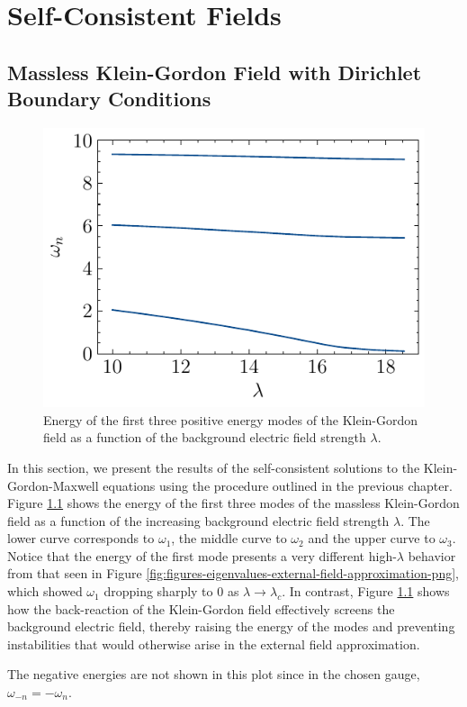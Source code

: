 \chapter{Self-Consistent Fields}
\section{Massless Klein-Gordon Field with Dirichlet Boundary Conditions}

\begin{figure} \centering \includegraphics[width=0.5\linewidth]{figures/dirichlet/eigenvaluesHadamardDirichlet.pdf} \caption{Energy of the first three positive energy modes of the Klein-Gordon field as a function of the background electric field strength $\lambda$.} \label{fig:eigenvaluesHadamardDirichlet} \end{figure}

In this section, we present the results of the self-consistent solutions to the Klein-Gordon-Maxwell equations using the procedure outlined in the previous chapter. Figure \ref{fig:eigenvaluesHadamardDirichlet} shows the energy of the first three modes of the massless Klein-Gordon field as a function of the increasing background electric field strength $\lambda$. The lower curve corresponds to $\omega_1$, the middle curve to $\omega_2$ and the upper curve to $\omega_3$.
Notice that the energy of the first mode presents a very different high-$\lambda$ behavior from that seen in Figure \ref{fig:figures-eigenvalues-external-field-approximation-png}, which showed $\omega_1$ dropping sharply to 0 as $\lambda\to\lambda_c$.  In contrast, Figure \ref{fig:eigenvaluesHadamardDirichlet} shows how the back-reaction of the Klein-Gordon field effectively screens the background electric field, thereby raising the energy of the modes and preventing instabilities that would  otherwise arise in the external field approximation.

The negative energies are not shown in this plot since in the chosen gauge, $\omega_{-n} = -\omega_n$. 

